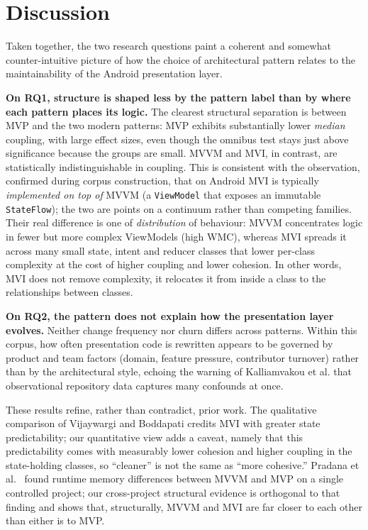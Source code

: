 \documentclass[conference]{IEEEtran}
\begin{document}
\section{Discussion} \label{sec:Discussion}

Taken together, the two research questions paint a coherent and somewhat
counter-intuitive picture of how the choice of architectural pattern relates to
the maintainability of the Android presentation layer.

\textbf{On RQ1, structure is shaped less by the pattern label than by where each
pattern places its logic.} The clearest structural separation is between MVP and
the two modern patterns: MVP exhibits substantially lower \emph{median} coupling,
with large effect sizes, even though the omnibus test stays just above
significance because the groups are small. MVVM and MVI, in contrast, are statistically
indistinguishable in coupling. This is consistent with the observation,
confirmed during corpus construction, that on Android MVI is typically
\emph{implemented on top of} MVVM (a \texttt{ViewModel} that exposes an immutable
\texttt{StateFlow}); the two are points on a continuum rather than competing
families. Their real difference is one of \emph{distribution} of behaviour:
MVVM concentrates logic in fewer but more complex ViewModels (high WMC), whereas
MVI spreads it across many small state, intent and reducer classes that lower
per-class complexity at the cost of higher coupling and lower cohesion. In other
words, MVI does not remove complexity, it relocates it from inside a class to the
relationships between classes.

\textbf{On RQ2, the pattern does not explain how the presentation layer evolves.}
Neither change frequency nor churn differs across patterns. Within this corpus,
how often presentation code is rewritten appears to be governed by product and
team factors (domain, feature pressure, contributor turnover) rather than by the
architectural style, echoing the warning of Kalliamvakou et al.
\cite{Kalliamvakou:2014} that observational repository data captures many
confounds at once.

These results refine, rather than contradict, prior work. The qualitative
comparison of Vijaywargi and Boddapati \cite{Vijaywargi:2024} credits MVI with
greater state predictability; our quantitative view adds a caveat, namely that
this predictability comes with measurably lower cohesion and higher coupling in
the state-holding classes, so ``cleaner'' is not the same as ``more cohesive.''
Pradana et al.\ \cite{Pradana:2025} found runtime memory differences between MVVM
and MVP on a single controlled project; our cross-project structural evidence is
orthogonal to that finding and shows that, structurally, MVVM and MVI are far
closer to each other than either is to MVP.
\end{document}
